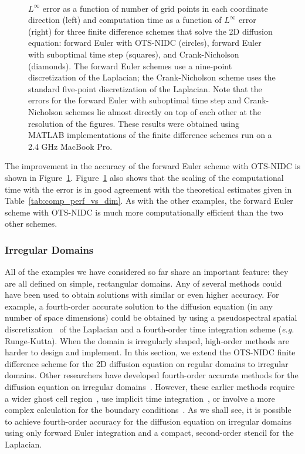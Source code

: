 \documentclass[fleqn,12pt,twoside]{article}
\def\eg{\emph{e.g. }}
\begin{document}
\begin{figure}[tb]
\begin{center}
\ \ 
\caption{$L^\infty$ error as a function of number of grid points in
each coordinate direction (left) and computation time as a function of 
$L^\infty$ error (right) for three finite difference schemes that solve the 
2D diffusion equation:
forward Euler with OTS-NIDC (circles), forward 
Euler with suboptimal time step (squares), and Crank-Nicholson (diamonds).  
The forward Euler schemes use a nine-point discretization of the Laplacian;
the Crank-Nicholson scheme uses the standard five-point discretization of
the Laplacian.  
Note that the errors for the forward Euler with suboptimal time step and 
Crank-Nicholson schemes lie almost directly on top of each other at the 
resolution of the figures.  
These results were obtained using MATLAB implementations of the 
finite difference schemes run on a 2.4 GHz MacBook Pro.
}
\label{fig:diffusion_eqn_2d_src_analysis}
\end{center}
\end{figure}
The improvement in the accuracy of the forward Euler scheme with OTS-NIDC
is shown in Figure~\ref{fig:diffusion_eqn_2d_src_analysis}.
Figure~\ref{fig:diffusion_eqn_2d_src_analysis} also shows that the 
scaling of the computational time with the error is in good agreement with the
theoretical estimates given in Table~\ref{tab:comp_perf_vs_dim}.  As with the
other examples, the forward Euler scheme with OTS-NIDC is much 
more computationally efficient than the two other schemes.  


\subsubsection{Irregular Domains}
All of the examples we have considered so far share an important feature: they 
are all defined on simple, rectangular domains.  Any of several methods 
could have been used to obtain solutions with similar or even higher accuracy.
For example, a fourth-order accurate solution to the diffusion equation
(in any number of space dimensions) could be obtained by using a 
pseudospectral spatial 
discretization~\cite{trefethen_spectral_book,boyd_spectral_book} 
of the Laplacian and a fourth-order time integration scheme 
(\eg Runge-Kutta).  When the domain is irregularly shaped, high-order methods 
are harder to design and implement.  
In this section, we extend the OTS-NIDC finite difference scheme for the 2D 
diffusion equation on regular domains to irregular domains.  Other 
researchers have developed fourth-order accurate methods for the diffusion 
equation on irregular domains~\cite{gibou_2005,ito_2005}.  However, these 
earlier methods require a wider ghost cell region~\cite{gibou_2005}, use
implicit time integration~\cite{gibou_2005,ito_2005}, or involve a more 
complex calculation for the boundary conditions~\cite{ito_2005}.  As we shall 
see, it is possible to achieve fourth-order accuracy for the diffusion 
equation on irregular domains using only forward Euler integration and a 
compact, second-order stencil for the Laplacian.
\end{document}
